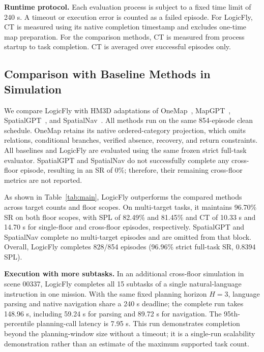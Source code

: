 \documentclass[letterpaper,10pt,journal]{IEEEtran}
\begin{document}
\textbf{Runtime protocol.}
Each evaluation process is subject to a fixed time limit of 240 s. A timeout or execution error is counted as a failed episode. For LogicFly, CT is measured using its native completion timestamp and excludes one-time map preparation. For the comparison methods, CT is measured from process startup to task completion. CT is averaged over successful episodes only.





\subsection{Comparison with Baseline Methods in Simulation}
We compare LogicFly with HM3D adaptations of OneMap~\cite{busch2025onemap}, MapGPT~\cite{chen2024mapgpt}, SpatialGPT~\cite{jiang2025spatialgpt}, and SpatialNav~\cite{zhang2026spatialnav}. All methods run on the same 854-episode clean schedule. OneMap retains its native ordered-category projection, which omits relations, conditional branches, verified absence, recovery, and return constraints. All baselines and LogicFly are evaluated using the same frozen strict full-task evaluator. SpatialGPT and SpatialNav do not successfully complete any cross-floor episode, resulting in an SR of 0\%; therefore, their remaining cross-floor metrics are not reported.

As shown in Table~\ref{tab:main}, LogicFly outperforms the compared methods across target counts and floor scopes. On multi-target tasks, it maintains 96.70\% SR on both floor scopes, with SPL of 82.49\% and 81.45\% and CT of 10.33 s and 14.70 s for single-floor and cross-floor episodes, respectively. SpatialGPT and SpatialNav complete no multi-target episodes and are omitted from that block. Overall, LogicFly completes 828/854 episodes (96.96\% strict full-task SR, 0.8394 SPL).



\textbf{Execution with more subtasks.}
In an additional cross-floor simulation in scene 00337, LogicFly completes all 15 subtasks of a single natural-language instruction in one mission. With the same fixed planning horizon $H=3$, language parsing and native navigation share a 240 s deadline; the complete run takes 148.96 s, including 59.24 s for parsing and 89.72 s for navigation. The 95th-percentile planning-call latency is 7.95 s. This run demonstrates completion beyond the planning-window size without a timeout; it is a single-run scalability demonstration rather than an estimate of the maximum supported task count.
\end{document}
